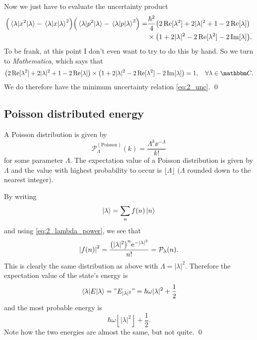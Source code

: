 \documentclass[11pt,letter, swedish, english
]{article}
\begin{document}
Now we just have to evaluate the uncertainty product
\begin{equation}
\begin{aligned}
\qty(\ev{x^2}{\lambda}-\ev{x}{\lambda}^2)
\qty(\ev{p^2}{\lambda}-\ev{p}{\lambda}^2)
=&\frac{\hbar^2}{4}
\qty(2\Re[\lambda^2] + 2|\lambda|^2 + 1 - 2\Re[\lambda])\\
&\times\qty(1+2|\lambda|^2 - 2\Re[\lambda^2]-2\Im[\lambda]).
\end{aligned}
\end{equation}
To be frank, at this point I don't even want to try to do this by
hand. So we turn to \emph{Mathematica}, which
 says that
\begin{equation}
\qty(2\Re[\lambda^2] + 2|\lambda|^2 + 1 - 2\Re[\lambda])
\times\qty(1+2|\lambda|^2 - 2\Re[\lambda^2]-2\Im[\lambda])
=1\qcomma\forall\lambda\in\C.
\end{equation}
We do therefore have the minimum uncertainty relation
\eqref{eq:2_unc}. 
\qed

\subsection{Poisson distributed energy}
A Poisson distribution is given by
\begin{equation}
\mathcal{P}_\Lambda^{(\text{Poisson})}(k)=\frac{\Lambda^k\ee^{-\Lambda}}{k!}
\end{equation}
for some parameter $\Lambda$. The expectation value of a Poisson
distribution is given by $\Lambda$ and the value with highest
probability to occur is $\lfloor\Lambda\rfloor$ ($\Lambda$ rounded
down to the nearest integer).

By writing
\begin{equation}
\ket{\lambda}=\sum_n f(n)\ket{n}
\end{equation}
and using \eqref{eq:2_lambda_power}, we see that
\begin{equation}
\abs{f(n)}^2=\frac{\qty(|\lambda|^2)^n\mathrm{e}^{-|\lambda|^2}}{n!}
=\mathcal{P}_\lambda(n).
\end{equation}
This is clearly the same distribution as above with
$\Lambda=|\lambda|^2$. Therefore the expectation value of the state's
energy is
\begin{equation}
\ev{E}{\lambda}="E_{|\lambda|^2}"=\hbar\omega|\lambda|^2+\frac{1}{2}
\end{equation}
and the most probable energy is
\begin{equation}
\hbar\omega\left\lfloor|\lambda|^2\right\rfloor+\frac{1}{2}.
\end{equation}
Note how the two energies are almost the same, but not quite. 
\qed
\end{document}
